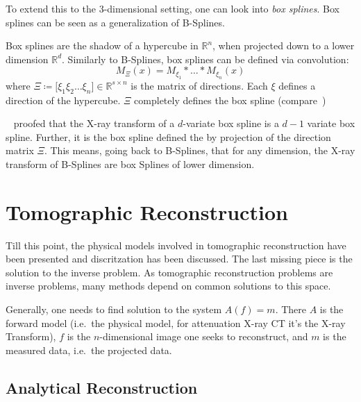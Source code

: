 To extend this to the \(3\)-dimensional setting, one can look into \textit{box splines}. Box splines
can be seen as a generalization of B-Splines.

\begin{definition}
	Box splines are the shadow of a hypercube in \(\mathbb{R}^n\), when projected down to a
	lower dimension \(\mathbb{R}^d\). Similarly to B-Splines, box splines can be defined via
	convolution:
	\begin{equation}
		M_\Xi(x) = M_{\xi_1} * \dots * M_{\xi_n}(x)
	\end{equation}
	where \(\Xi \coloneq \mathopen[ \xi_1 \xi_2 \dots \xi_n \mathclose] \in \mathbb{R}^{s \times n}\)
	is the matrix of directions. Each \(\xi\) defines a direction of the hypercube.
	\(\Xi\) completely defines the box spline (compare~\cite{de_boor_box_1993})
\end{definition}

\citeauthor*{entezari_box_2012}~\cite{entezari_box_2012} proofed that the X-ray transform of a
\(d\)-variate box spline is a \(d - 1\) variate box spline. Further, it is the box spline defined
the by projection of the direction matrix \(\Xi\). This means, going back to B-Splines, that for any
dimension, the X-ray transform of B-Splines are box Splines of lower dimension.

\chapter{Tomographic Reconstruction}\label{chap:tomographic_reconstruction}

Till this point, the physical models involved in tomographic reconstruction have been presented and
discritzation has been discussed. The last missing piece is the solution to the inverse problem.
As tomographic reconstruction problems are inverse problems, many methods depend on common solutions
to this space.

Generally, one needs to find solution to the system \(A(f) = m\). There \(A\) is the forward model
(i.e.\ the physical model, for attenuation X-ray CT it's the X-ray Transform), \(f\) is the
\(n\)-dimensional image one seeks to reconstruct, and \(m\) is the measured data, i.e.\ the
projected data.

\section{Analytical Reconstruction}\label{sec:analytical_reconstruction}

